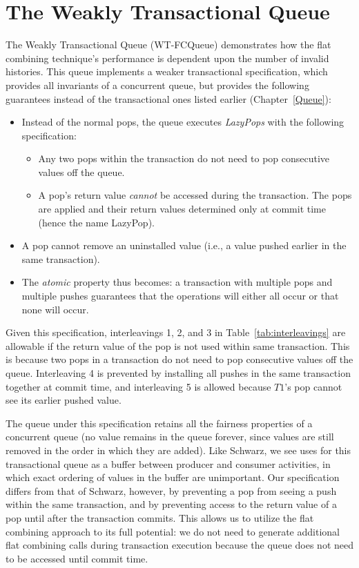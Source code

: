 \section{The Weakly Transactional Queue} 

The Weakly Transactional Queue (WT-FCQueue) demonstrates how the flat combining technique's performance is dependent upon the number of invalid histories. This queue implements a weaker transactional specification, which provides all invariants of a concurrent queue, but provides the following guarantees instead of the transactional ones listed earlier (Chapter~\ref{Queue}):
\begin{itemize}
    \item Instead of the normal pops, the queue executes \emph{LazyPops} with the following specification:
        \begin{itemize}
            \item Any two pops within the transaction do not need to pop consecutive values off the queue.
            \item A pop's return value \emph{cannot} be accessed during the transaction. The pops are applied and their return values determined only at commit time (hence the name LazyPop). 
        \end{itemize}
    \item A pop cannot remove an uninstalled value (i.e., a value pushed earlier in the same transaction).
    \item The \emph{atomic} property thus becomes: a transaction with multiple pops and multiple pushes guarantees that the operations will either all occur or that none will occur.
\end{itemize}

Given this specification, interleavings 1, 2, and 3 in Table~\ref{tab:interleavings} are allowable if the return value of the pop is not used within same transaction. This is because two pops in a transaction do not need to pop consecutive values off the queue. Interleaving 4 is prevented by installing all pushes in the same transaction together at commit time, and interleaving 5 is allowed because $T1$'s pop cannot see its earlier pushed value.

The queue under this specification retains all the fairness properties of a concurrent queue (no value remains in the queue forever, since values are still removed in the order in which they are added). Like Schwarz\cite{schwarz}, we see uses for this transactional queue as a buffer between producer and consumer activities, in which exact ordering of values in the buffer are unimportant.
Our specification differs from that of Schwarz\cite{schwarz}, however, by preventing a pop from seeing a push within the same transaction, and by preventing access to the return value of a pop until after the transaction commits. This allows us to utilize the flat combining approach to its full potential: we do not need to generate additional flat combining calls during transaction execution because the queue does not need to be accessed until commit time.


